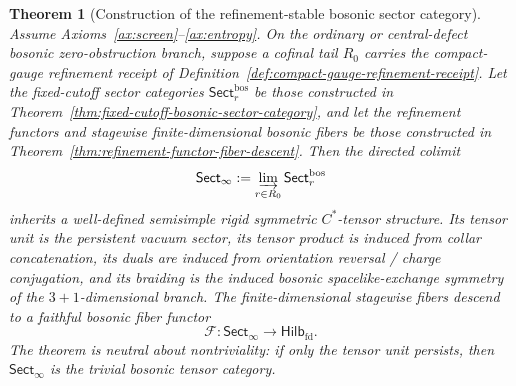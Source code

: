 \documentclass[11pt]{article}
\newtheorem{theorem}{Theorem}[section]
\begin{document}
\begin{theorem}[Construction of the refinement-stable bosonic sector category]\label{thm:sector-colimit}
Assume Axioms~\ref{ax:screen}--\ref{ax:entropy}. On the ordinary or central-defect bosonic
zero-obstruction branch, suppose a cofinal tail \(R_0\) carries the compact-gauge refinement
receipt of Definition~\ref{def:compact-gauge-refinement-receipt}. Let the fixed-cutoff sector categories
\(\mathsf{Sect}^{\mathrm{bos}}_r\) be those constructed in
Theorem~\ref{thm:fixed-cutoff-bosonic-sector-category}, and let the refinement functors and
stagewise finite-dimensional bosonic fibers be those constructed in
Theorem~\ref{thm:refinement-functor-fiber-descent}. Then the directed colimit
\[
\mathsf{Sect}_\infty:=\varinjlim_{r\in R_0} \mathsf{Sect}^{\mathrm{bos}}_r
\]
inherits a well-defined semisimple rigid symmetric \(C^*\)-tensor structure. Its tensor unit is
the persistent vacuum sector, its tensor product is induced from collar concatenation, its duals
are induced from orientation reversal / charge conjugation, and its braiding is the induced
bosonic spacelike-exchange symmetry of the \(3+1\)-dimensional branch. The finite-dimensional
stagewise fibers descend to a faithful bosonic fiber functor
\[
\mathcal F:\mathsf{Sect}_\infty\to\mathsf{Hilb}_{\mathrm{fd}}.
\]
The theorem is neutral about nontriviality: if only the tensor unit persists, then
\(\mathsf{Sect}_\infty\) is the trivial bosonic tensor category.
\end{theorem}
\end{document}
